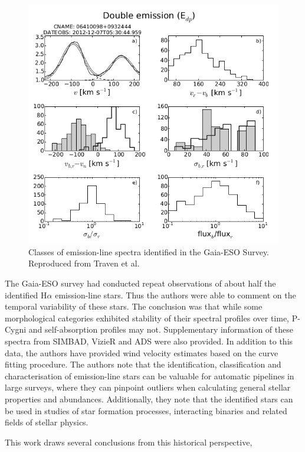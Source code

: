 \begin{figure}[!htb]
\centering
\includegraphics[scale=.50]{figures/gaia eso2.png}
\caption{Classes of emission-line spectra identified in the Gaia-ESO Survey. Reproduced from Traven et al.}
\end{figure}

The Gaia-ESO survey had conducted repeat observations of about half the identified H$\alpha$ emission-line stars. Thus the authors were able to comment on the temporal variability of these stars. The conclusion was that while some morphological categories exhibited stability of their spectral profiles over time, P-Cygni and self-absorption profiles may not. Supplementary information of these spectra from SIMBAD, VizieR and ADS were also provided. In addition to this data, the authors have provided wind velocity estimates based on the curve fitting procedure. The authors note that the identification, classification and characterisation of emission-line stars can be valuable for automatic pipelines in large surveys, where they can pinpoint outliers when calculating general stellar properties and abundances. Additionally, they note that the identified stars can be used in studies of star formation processes, interacting binaries and related fields of stellar physics. 

This work draws several conclusions from this historical perspective,


